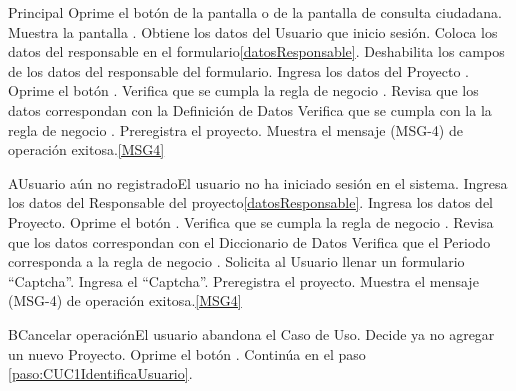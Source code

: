 	\begin{UCtrayectoria}{Principal}
			\UCpaso[\UCactor] Oprime el botón  de la pantalla  o de la pantalla de consulta ciudadana.
			\UCpaso Muestra la pantalla .
			\UCpaso Obtiene los datos del Usuario que inicio sesión.
			\UCpaso Coloca los datos del responsable en el formulario\ref{datosResponsable}.
			\UCpaso Deshabilita los campos de los datos del responsable del formulario.
			\UCpaso [\UCactor] Ingresa los datos del Proyecto .\label{paso:CUC1.1IngresaDatosProyecto} 
			\UCpaso [\UCactor] Oprime el botón .
			\UCpaso Verifica que se cumpla la regla de negocio .
			\UCpaso Revisa que los datos correspondan con la Definición de Datos 
			\UCpaso Verifica que se cumpla con la la regla de negocio .
			\UCpaso Preregistra el proyecto.\label{paso:CUC1.1PreRegistraProyecto}
			\UCpaso Muestra el mensaje (MSG-4) de operación exitosa.\ref{MSG4}

	\end{UCtrayectoria}

	\begin{UCtrayectoriaA}{A}{Usuario aún no registrado}{El usuario no ha iniciado sesión en el sistema.}
			\UCpaso [\UCactor] Ingresa los datos del Responsable del proyecto\ref{datosResponsable}.
			\UCpaso [\UCactor] Ingresa los datos del Proyecto.
			\UCpaso [\UCactor] Oprime el botón .
			\UCpaso Verifica que se cumpla la regla de negocio .
			\UCpaso Revisa que los datos correspondan con el Diccionario de Datos 
			\UCpaso Verifica que el Periodo corresponda a la regla de negocio .
			\UCpaso Solicita al Usuario llenar un formulario ``Captcha''.
			\UCpaso [\UCactor] Ingresa el ``Captcha''.
			\UCpaso Preregistra el proyecto.\label{paso:CUC1.1PreRegistraProyecto}
			\UCpaso Muestra el mensaje (MSG-4) de operación exitosa.\ref{MSG4}
	\end{UCtrayectoriaA}

	\begin{UCtrayectoriaA}{B}{Cancelar operación}{El usuario abandona el Caso de Uso.}
			\UCpaso[\UCactor] Decide ya no agregar un nuevo Proyecto.
			\UCpaso[\UCactor] Oprime el botón .
			\UCpaso Continúa en el paso \ref{paso:CUC1IdentificaUsuario}.
	\end{UCtrayectoriaA}


